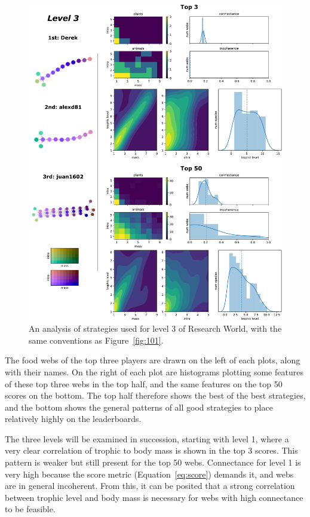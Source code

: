 \begin{figure}
  \centering
  \includegraphics[height=.85\textheight, right]{joy/103.pdf}
  \caption[Results from Research World level 3]{An analysis of strategies used for level 3 of Research World, with the same conventions as Figure~\ref{fig:101}.}
  \label{fig:103}
\end{figure}
The food webs of the top three players are drawn on the left of each plots, along with their names. On the right of each plot are histograms plotting some features of these top three webs in the top half, and the same features on the top 50 scores on the bottom. The top half therefore shows the best of the best strategies, and the bottom shows the general patterns of all good strategies to place relatively highly on the leaderboards.

The three levels will be examined in succession, starting with level 1, where a very clear correlation of trophic to body mass is shown in the top 3 scores. This pattern is weaker but still present for the top 50 webs.
Connectance for level 1 is very high because the score metric (Equation~\eqref{eq:score}) demands it, and webs are in general incoherent. From this, it can be posited that a strong correlation between trophic level and body mass is necessary for webs with high connectance to be feasible.

